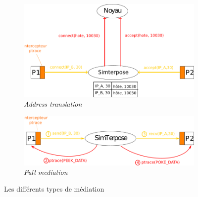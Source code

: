 \begin{figure}[H]
   \centering
   \begin{subfigure}{0.5\textwidth}
   \includegraphics[scale=0.5]{Pictures/png/Mediation_translation_v2}
   \caption{\textit{Address translation}}
   \label{ADDRESS_TRANSLATION}
   \end{subfigure}
   \begin{subfigure}{0.4\textwidth}
     \includegraphics[scale=0.5]{Pictures/png/Mediation_full_v2}
  \caption{\textit{Full mediation}}
  \label{FULL_MEDIATION}
   \end{subfigure}
   \caption{Les différents types de médiation}
   \label{MEDIATION}
 \end{figure}

